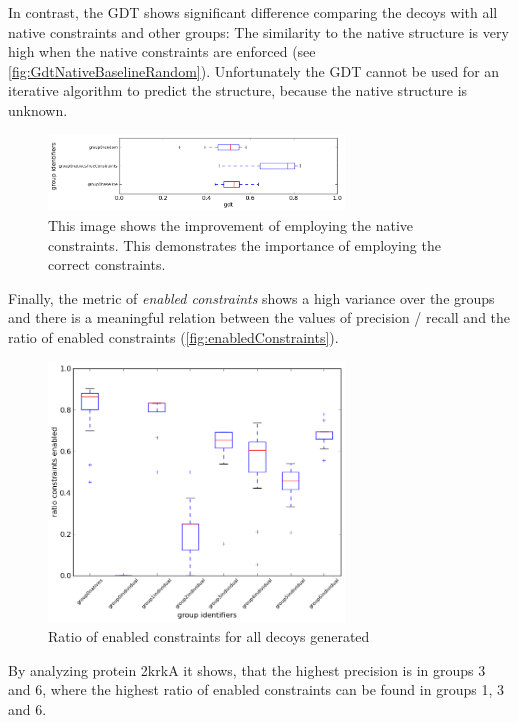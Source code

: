 \documentclass[a4paper, 11pt, parskip=half]{scrartcl}
\begin{document}
In contrast, the GDT shows significant difference comparing the decoys with all native constraints and other groups: The similarity to the native structure is very high when the native constraints are enforced (see \autoref{fig:GdtNativeBaselineRandom}). Unfortunately the GDT cannot be used for an iterative algorithm to predict the structure, because the native structure is unknown.\\
\begin{figure}
    \centering
    \includegraphics[width=0.7\textwidth]{GdtNativeBaselineRandom.png}
    \caption{This image shows the improvement of employing the native constraints. This demonstrates the importance of employing the correct constraints.}
    \label{fig:GdtNativeBaselineRandom}
\end{figure}

Finally, the metric of \emph{enabled constraints} shows a high variance over the groups and there is a meaningful relation between the values of precision / recall and the ratio of enabled constraints (\autoref{fig:enabledConstraints}). 
\begin{figure}
    \centering
    \includegraphics[width=0.7\textwidth]{enabledConstraintsIndividual.png}
    \caption{Ratio of enabled constraints for all decoys generated}
    \label{fig:enabledConstraints}
\end{figure}
    
By analyzing protein 2krkA it shows, that the highest precision is in groups 3 and 6, where the highest ratio of enabled constraints can be found in groups 1, 3 and 6.
\end{document}
